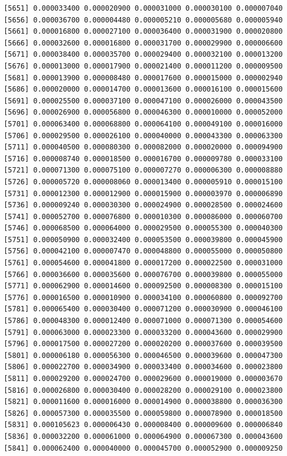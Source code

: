 \documentclass[]{article}
\begin{document}
\begin{verbatim}
 [5651] 0.000033400 0.000020900 0.000031000 0.000030100 0.000007040
 [5656] 0.000036700 0.000004480 0.000005210 0.000005680 0.000005940
 [5661] 0.000016800 0.000027100 0.000036400 0.000031900 0.000020800
 [5666] 0.000032600 0.000016800 0.000031700 0.000029900 0.000006600
 [5671] 0.000038400 0.000035700 0.000029400 0.000032100 0.000013200
 [5676] 0.000013000 0.000017900 0.000021400 0.000011200 0.000009500
 [5681] 0.000013900 0.000008480 0.000017600 0.000015000 0.000002940
 [5686] 0.000020000 0.000014700 0.000013600 0.000016100 0.000015600
 [5691] 0.000025500 0.000037100 0.000047100 0.000026000 0.000043500
 [5696] 0.000026900 0.000056800 0.000046300 0.000010000 0.000052000
 [5701] 0.000063400 0.000068800 0.000064100 0.000049100 0.000016000
 [5706] 0.000029500 0.000026100 0.000040000 0.000043300 0.000063300
 [5711] 0.000040500 0.000080300 0.000082000 0.000020000 0.000094900
 [5716] 0.000008740 0.000018500 0.000016700 0.000009780 0.000033100
 [5721] 0.000071300 0.000075100 0.000007270 0.000006300 0.000008880
 [5726] 0.000005720 0.000008060 0.000013400 0.000005910 0.000015100
 [5731] 0.000012300 0.000012900 0.000015900 0.000003970 0.000006890
 [5736] 0.000009240 0.000030300 0.000024900 0.000028500 0.000024600
 [5741] 0.000052700 0.000076800 0.000010300 0.000086000 0.000060700
 [5746] 0.000068500 0.000064000 0.000029500 0.000055300 0.000040300
 [5751] 0.000050900 0.000032400 0.000053500 0.000039800 0.000045900
 [5756] 0.000042100 0.000007470 0.000048800 0.000055000 0.000050800
 [5761] 0.000054600 0.000041800 0.000017200 0.000022500 0.000031000
 [5766] 0.000036600 0.000035600 0.000076700 0.000039800 0.000055000
 [5771] 0.000062900 0.000014600 0.000092500 0.000008300 0.000015100
 [5776] 0.000016500 0.000010900 0.000034100 0.000060800 0.000092700
 [5781] 0.000065400 0.000030400 0.000071200 0.000030900 0.000046100
 [5786] 0.000048300 0.000012400 0.000071000 0.000071300 0.000054600
 [5791] 0.000063000 0.000023300 0.000033200 0.000043600 0.000029900
 [5796] 0.000017500 0.000027200 0.000020200 0.000037600 0.000039500
 [5801] 0.000006180 0.000056300 0.000046500 0.000039600 0.000047300
 [5806] 0.000022700 0.000034900 0.000033400 0.000034600 0.000023800
 [5811] 0.000029200 0.000024700 0.000029600 0.000019000 0.000003670
 [5816] 0.000026800 0.000030400 0.000028200 0.000029100 0.000023800
 [5821] 0.000011600 0.000016000 0.000014900 0.000038800 0.000036300
 [5826] 0.000057300 0.000035500 0.000059800 0.000078900 0.000018500
 [5831] 0.000105623 0.000006430 0.000008400 0.000009600 0.000006840
 [5836] 0.000032200 0.000061000 0.000064900 0.000067300 0.000043600
 [5841] 0.000062400 0.000040000 0.000045700 0.000052900 0.000009250

\end{verbatim}
\end{document}
